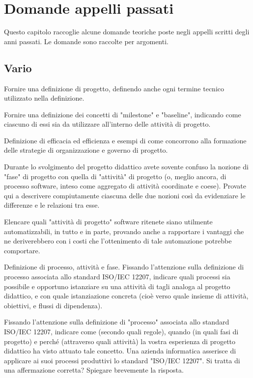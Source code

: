 \chapter{Domande appelli passati}

Questo capitolo raccoglie alcune domande teoriche poste negli appelli scritti degli anni passati. Le domande sono raccolte per argomenti.

\section{Vario}

Fornire una definizione di progetto, definendo anche ogni termine tecnico utilizzato nella definizione.

Fornire una definizione dei concetti di "milestone" e "baseline", indicando come ciascuno di essi sia da utilizzare all'interno delle attività di progetto.

Definizione di efficacia ed efficienza e esempi di come concorrono alla formazione delle strategie di organizzazione e governo di progetto.

Durante lo svolgimento del progetto didattico avete sovente confuso la nozione di "fase" di progetto con quella di "attività" di progetto (o, meglio ancora, di processo software, inteso come aggregato di attività coordinate e coese). Provate qui a descrivere compiutamente ciascuna delle due nozioni così da evidenziare le differenze e le relazioni tra esse.

Elencare quali "attività di progetto" software ritenete siano utilmente automatizzabili, in tutto e in parte, provando anche a rapportare i vantaggi che ne deriverebbero con i costi che l'ottenimento di tale automazione potrebbe comportare.


Definizione di processo, attività e fase.
Fissando l'attenzione sulla definizione di processo associata allo standard ISO/IEC 12207, indicare quali processi sia possibile e opportuno istanziare su una attività di tagli analoga al progetto didattico, e con quale istanziazione concreta (cioè verso quale insieme di attività, obiettivi, e flussi di dipendenza).

Fissando l'attenzione sulla definizione di "processo" associata allo standard ISO/IEC 12207, indicare come (secondo quali regole), quando (in quali fasi di progetto) e perché (attraverso quali attività) la vostra esperienza di progetto didattico ha visto attuato tale concetto. 
Una azienda informatica asserisce di applicare ai suoi processi produttivi lo standard "ISO/IEC 12207". Si tratta di una affermazione corretta? Spiegare brevemente la risposta.


